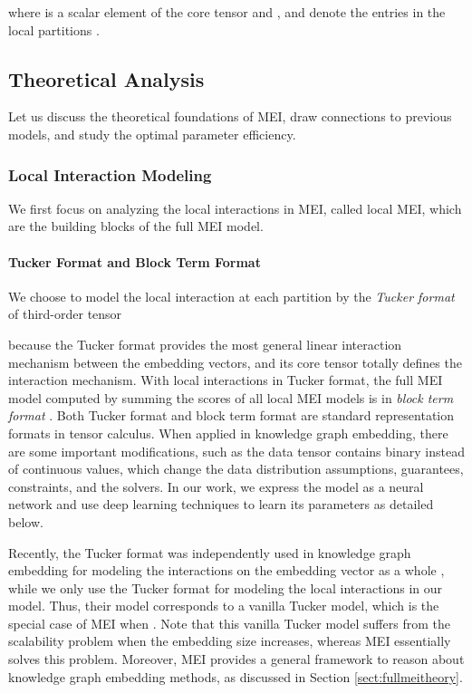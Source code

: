 \documentclass{ecai}
\theoremstyle{plain}  \newtheorem{thm}{Theorem}  \newtheorem{lem}[thm]{Lemma}  \newtheorem{prop}[thm]{Proposition}
\theoremstyle{remark}  \newtheorem*{rem}{Remark}
\begin{document}
where  is a scalar element of the core tensor  and , and  denote the entries in the local partitions .

\subsection{Theoretical Analysis} \label{sect:theory} Let us discuss the theoretical foundations of MEI, draw connections to previous models, and study the optimal parameter efficiency.

\subsubsection{Local Interaction Modeling} \label{sect:localtheory}
We first focus on analyzing the local interactions in MEI, called local MEI, which are the building blocks of the full MEI model.

\paragraph{Tucker Format and Block Term Format}
We choose to model the local interaction at each partition by the \textit{Tucker format} \cite{tucker_mathematicalnotesthreemode_1966} of third-order tensor

because the Tucker format provides the most general linear interaction mechanism between the embedding vectors, and its core tensor totally defines the interaction mechanism. With local interactions in Tucker format, the full MEI model computed by summing the scores of all local MEI models is in \textit{block term format} \cite{delathauwer_decompositionshigherordertensor_2008a}. Both Tucker format and block term format are standard representation formats in tensor calculus. When applied in knowledge graph embedding, there are some important modifications, such as the data tensor contains binary instead of continuous values, which change the data distribution assumptions, guarantees, constraints, and the solvers. In our work, we express the model as a neural network and use deep learning techniques to learn its parameters as detailed below.

Recently, the Tucker format was independently used in knowledge graph embedding for modeling the interactions on the embedding vector as a whole \cite{balazevic_tuckertensorfactorization_2019}, while we only use the Tucker format for modeling the local interactions in our model. Thus, their model corresponds to a vanilla Tucker model, which is the special case of MEI when . Note that this vanilla Tucker model suffers from the scalability problem when the embedding size increases, whereas MEI essentially solves this problem. Moreover, MEI provides a general framework to reason about knowledge graph embedding methods, as discussed in Section \ref{sect:fullmeitheory}.
\end{document}
